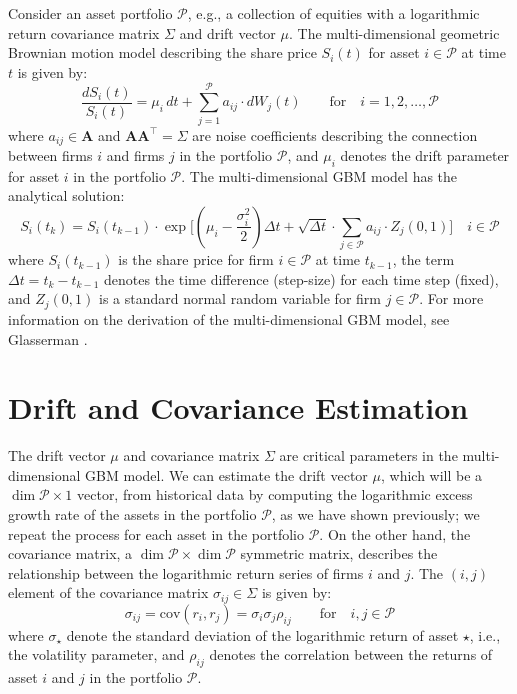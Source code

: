 \documentclass[11pt]{article}
\theoremstyle{definition}
\begin{document}
Consider an asset portfolio $\mathcal{P}$, e.g., a collection of equities with a logarithmic return covariance matrix $\Sigma$ and drift vector $\mu$.
The multi-dimensional geometric Brownian motion model describing the share price $S_{i}(t)$ for asset $i\in\mathcal{P}$ at time $t$ is given by: 
\begin{equation*}
\frac{dS_{i}\left(t\right)}{S_{i}(t)} = \mu_{i}\,{dt}+\sum_{j=1}^{\mathcal{P}}a_{ij}\cdot{dW_{j}(t)}\qquad\text{for}\quad{i=1,2,\dots,\mathcal{P}}
\end{equation*}
where $a_{ij}\in\mathbf{A}$ and $\mathbf{A}\mathbf{A}^{\top} = \Sigma$ are noise coefficients describing the connection between firms $i$ and firms $j$ in the portfolio $\mathcal{P}$,
and $\mu_{i}$ denotes the drift parameter for asset $i$ in the portfolio $\mathcal{P}$.
The multi-dimensional GBM model has the analytical solution:
\begin{equation*}
S_{i}(t_{k}) = S_{i}(t_{k-1})\cdot\exp\Biggl[\left(\mu_{i}-\frac{\sigma_{i}^{2}}{2}\right)\Delta{t} + \sqrt{\Delta{t}}\cdot\sum_{j\in\mathcal{P}}a_{ij}\cdot{Z_{j}(0,1)}\Biggr]\quad{i\in\mathcal{P}}
\end{equation*}
where $S_{i}(t_{k-1})$ is the share price for firm $i\in\mathcal{P}$ at time $t_{k-1}$,  the term $\Delta{t} = t_{k} - t_{k-1}$ denotes the time difference (step-size) 
for each time step (fixed), and $Z_{j}(0,1)$ is a standard normal random variable for firm $j\in\mathcal{P}$.
For more information on the derivation of the multi-dimensional GBM model, see Glasserman \cite{Glasserman:2004ua}.

\section*{Drift and Covariance Estimation}
The drift vector $\mu$ and covariance matrix $\Sigma$ are critical parameters in the multi-dimensional GBM model.
We can estimate the drift vector $\mu$, which will be a $\dim\mathcal{P}\times{1}$ vector, from historical data by computing the logarithmic excess growth rate of the assets in the portfolio $\mathcal{P}$, 
as we have shown previously; we repeat the process for each asset in the portfolio $\mathcal{P}$.
On the other hand, the covariance matrix, a $\dim\mathcal{P}\times\dim\mathcal{P}$ symmetric matrix, describes the relationship between the logarithmic return series of firms $i$ and $j$.
The $(i,j)$ element of the covariance matrix $\sigma_{ij}\in\Sigma$ is given by:
\begin{equation*}
    \sigma_{ij} = \text{cov}\left(r_{i},r_{j}\right) = \sigma_{i}\sigma_{j}\rho_{ij}\qquad\text{for}\quad{i,j \in \mathcal{P}}
\end{equation*}
where $\sigma_{\star}$ denote the standard deviation of the logarithmic return of asset $\star$, i.e., the volatility parameter, and $\rho_{ij}$ 
denotes the correlation between the returns of asset $i$ and $j$ in the portfolio $\mathcal{P}$. 
\end{document}
